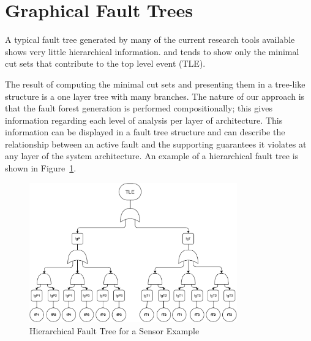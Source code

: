 \section{Graphical Fault Trees}
A typical fault tree generated by many of the current research tools available shows very little hierarchical information. and tends to show only the minimal cut sets that contribute to the top level event (TLE). 

The result of computing the minimal cut sets and presenting them in a tree-like structure is a one layer tree with many branches. The nature of our approach is that the fault forest generation is performed compositionally; this gives information regarding each level of analysis per layer of architecture. This information can be displayed in a fault tree structure and can describe the relationship between an active fault and the supporting guarantees it violates at any layer of the system architecture. An example of a hierarchical fault tree is shown in Figure~\ref{fig:ftSensor}. 

\begin{figure}[h!]
	\centering
	\includegraphics[trim=0 0 0 0,clip,width=0.8\textwidth]{images/ftSensor.pdf}
	\caption{Hierarchical Fault Tree for a Sensor Example}
	\label{fig:ftSensor}
\end{figure}

